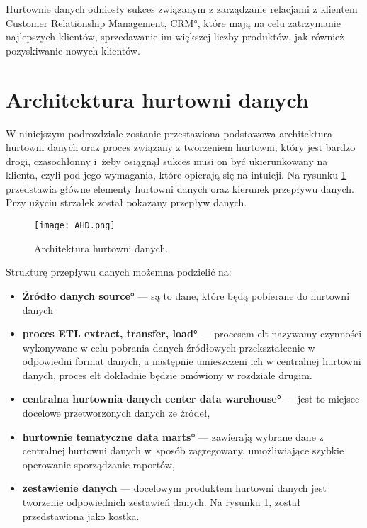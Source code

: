 Hurtownie danych odniosły sukces związanym z zarządzanie relacjami z klientem 
 \ang{Customer Relationship Management, CRM}, które mają na celu zatrzymanie najlepszych klientów,
 sprzedawanie im większej liczby produktów, jak również pozyskiwanie nowych klientów.

\section{Architektura hurtowni danych} \label{p_temat}
  W niniejszym podrozdziale zostanie przestawiona podstawowa architektura hurtowni danych oraz 
   proces związany z tworzeniem hurtowni, który jest bardzo drogi, czasochłonny 
   i~żeby osiągnął sukces musi on być ukierunkowany na klienta, czyli pod jego wymagania, 
   które opierają się na intuicji.
   Na rysunku \ref{fig:AHD} przedstawia główne elementy hurtowni danych oraz kierunek przepływu danych. Przy użyciu 
   strzałek został pokazany przepływ danych.\cite{TodMan} \cite{link_hd}

\begin{center}
\begin{figure}[H]
  \begin{center}
    \texttt{[image: AHD.png]}
  \end{center}
 \caption{Architektura hurtowni danych. }
    \label{fig:AHD}
\end{figure}
\end{center}


Strukturę przepływu danych możemna podzielić na:
\begin{itemize}
 \item \textbf{Źródło danych \ang{source} } --- 
    są to dane, które będą pobierane do hurtowni danych 
 \item \textbf{proces ETL \ang{extract, transfer, load} } --- 
    procesem elt nazywamy czynności wykonywane w celu pobrania danych źródłowych
    przekształcenie w odpowiedni format danych, a następnie umieszczeni ich w centralnej hurtowni danych,
    proces elt dokładnie będzie omówiony w rozdziale drugim.
 \item \textbf{centralna hurtownia danych \ang{center data  warehouse}} --- 
    jest to miejsce docelowe przetworzonych danych ze źródeł,						                                          
 \item \textbf{hurtownie tematyczne \ang{data marts}} --- 
    zawierają wybrane dane z centralnej hurtowni danych w~sposób 
    zagregowany, umożliwiające szybkie operowanie sporządzanie raportów,
 \item \textbf{zestawienie danych } --- 
    docelowym produktem hurtowni danych jest tworzenie odpowiednich zestawień danych.
    Na rysunku \ref{fig:AHD}, został przedstawiona jako kostka.
\end{itemize}

